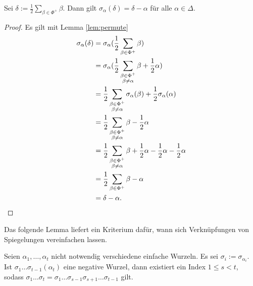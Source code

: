 \begin{cor}
  \label{cor:sigmaDelta}
  Sei $\delta := \tfrac{1}{2} \sum_{\beta \in \Phi^+} \beta$.
  Dann gilt $\sigma_\alpha(\delta) = \delta - \alpha$ für alle $\alpha \in \Delta$.
\end{cor}

\begin{proof}
  Es gilt mit Lemma \ref{lem:permute}
  \begin{align*}
    \sigma_\alpha(\delta) 
    &= \sigma_\alpha(\frac{1}{2} \sum_{\beta \in \Phi^+} \beta )\\
    &= \sigma_\alpha(\frac{1}{2} \sum_{\substack{\beta \in \Phi^+\\ \beta \neq \alpha}} \beta + \frac{1}{2}\alpha ) \\
    &= \frac{1}{2} \sum_{\substack{\beta \in \Phi^+\\ \beta \neq \alpha}} \sigma_\alpha(\beta) + \frac{1}{2} \sigma_\alpha(\alpha) \\
    &= \frac{1}{2} \sum_{\substack{\beta \in \Phi^+\\ \beta \neq \alpha}} \beta - \frac{1}{2} \alpha \\
    &= \frac{1}{2} \sum_{\substack{\beta \in \Phi^+\\ \beta \neq \alpha}} \beta + \frac{1}{2} \alpha  - \frac{1}{2} \alpha - \frac{1}{2} \alpha \\
    &= \frac{1}{2} \sum_{\beta \in \Phi^+} \beta - \alpha \\
    &= \delta - \alpha. \qedhere
  \end{align*}
\end{proof}

Das folgende Lemma liefert ein Kriterium dafür, wann sich Verknüpfungen von Spiegelungen vereinfachen lassen.

\begin{lem}
  \label{lem:simplify}
  Seien $\alpha_1,\dots,\alpha_t$ nicht notwendig verschiedene einfache Wurzeln. Es sei $\sigma_i := \sigma_{\alpha_i}$.
  Ist $\sigma_1 \dots \sigma_{t-1}(\alpha_t)$ eine negative Wurzel, dann existiert ein Index $1 \leq s < t$, sodass $\sigma_1 \dots \sigma_t = \sigma_1 \dots \sigma_{s-1} \sigma_{s+1} \dots \sigma_{t-1}$ gilt.
\end{lem}

